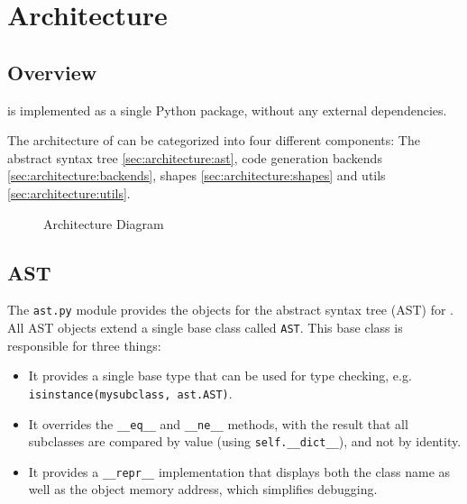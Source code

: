 
\chapter{Architecture}

\label{ch:architecture}


\section{Overview}\label{sec:architecture:overview}

\tangible{} is implemented as a single Python package, without any external
dependencies.

The architecture of \tangible{} can be categorized into four different
components: The abstract syntax tree \eqref{sec:architecture:ast}, code
generation backends \eqref{sec:architecture:backends}, shapes
\eqref{sec:architecture:shapes} and utils \eqref{sec:architecture:utils}.

\vspace{7mm}

\begin{figure}[H]
	\centering
	
	\caption{Architecture Diagram}
	\label{img:architecture}
\end{figure}


\section{AST}\label{sec:architecture:ast}

The \texttt{ast.py} module provides the objects for the abstract syntax tree
(AST) for \tangible{}. All AST objects extend a single base class called
\texttt{AST}. This base class is responsible for three things:

\begin{itemize}
	\item It provides a single base type that can be used for type checking, e.g.
		\texttt{isinstance(mysubclass, ast.AST)}.
	\item It overrides the \texttt{\_\_eq\_\_} and \texttt{\_\_ne\_\_} methods,
		with the result that all subclasses are compared by value (using
		\texttt{self.\_\_dict\_\_}), and not by identity.
	\item It provides a \texttt{\_\_repr\_\_} implementation that displays both
		the class name as well as the object memory address, which simplifies
		debugging.
\end{itemize}

